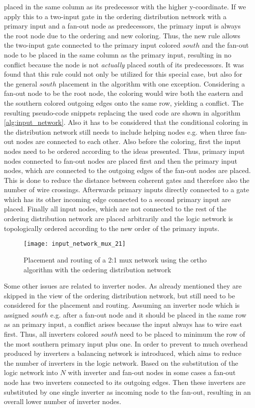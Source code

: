 placed in the same column as its predecessor with the higher y-coordinate. If we apply this to a two-input gate in the ordering distribution network with a primary input and a fan-out node as predecessors, the primary input is always the root node due to the ordering and new coloring. Thus, the new rule allows the two-input gate connected to the primary input colored $south$ and the fan-out node to be placed in the same column as the primary input, resulting in no conflict because the node is not \textit{actually} placed south of its predecessors. It was found that this rule could not only be utilized for this special case, but also for the general $south$ placement in the algorithm with one exception. Considering a fan-out node to be the root node, the coloring would wire both the eastern and the southern colored outgoing edges onto the same row, yielding a conflict. The resulting pseudo-code snippets replacing the used code are shown in algorithm \ref{alg:input_network}. Also it has to be considered that the conditional coloring in the distribution network still needs to include helping nodes e.g. when three fan-out nodes are connected to each other. Also before the coloring, first the input nodes need to be ordered according to the ideas presented. Thus, primary input nodes connected to fan-out nodes are placed first and then the primary input nodes, which are connected to the outgoing edges of the fan-out nodes are placed. This is done to reduce the distance between coherent gates and therefore also the number of wire crossings. Afterwards primary inputs directly connected to a gate which has its other incoming edge connected to a second primary input are placed. Finally all input nodes, which are not connected to the rest of the ordering distribution network are placed arbitrarily and the logic network is topologically ordered according to the new order of the primary inputs.
\begin{figure}
	\centering
	\texttt{[image: input\_network\_mux\_21]}
	\caption{Placement and routing of a 2:1 mux network using the ortho algorithm with the ordering distribution network}\label{fig:input_network_mux_21}
\end{figure}
Some other issues are related to inverter nodes. As already mentioned they are skipped in the view of the ordering distribution network, but still need to be considered for the placement and routing. Assuming an inverter node which is assigned $south$ e.g. after a fan-out node and it should be placed in the same row as an primary input, a conflict arises because the input always has to wire east first. Thus, all inverters colored $south$ need to be placed to minimum the row of the most southern primary input plus one. In order to prevent to much overhead produced by inverters a balancing network is introduced, which aims to reduce the number of inverters in the logic network. Based on the substitution of the logic network into $N$ with inverter and fan-out nodes in some cases a fan-out node has two inverters connected to its outgoing edges. Then these inverters are substituted by one single inverter as incoming node to the fan-out, resulting in an overall lower number of inverter nodes.
